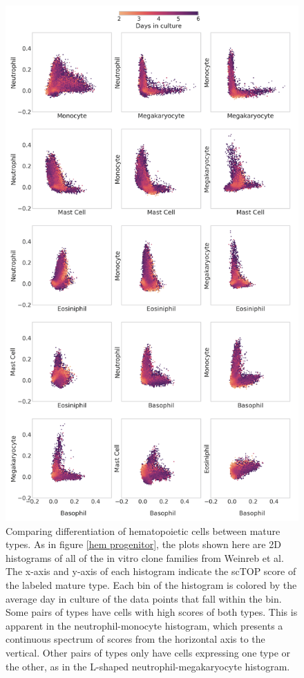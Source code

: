 \documentclass[aps,superscriptaddress, notitlepage,longbibliography]{revtex4-1}
\begin{document}
\begin{figure}
	\centering
		\includegraphics[scale=0.59]{figs/hem mature hists.png}
	\caption{Comparing differentiation of hematopoietic cells between mature types. As in figure \ref{hem progenitor}, the plots shown here are 2D histograms of all of the in vitro clone families from Weinreb et al. The x-axis and y-axis of each histogram indicate the scTOP score of the labeled mature type. Each bin of the histogram is colored by the average day in culture of the data points that fall within the bin.  Some pairs of types have cells with high scores of both types. This is apparent in the neutrophil-monocyte histogram, which presents a continuous spectrum of scores from the horizontal axis to the vertical. Other pairs of types only have cells expressing one type or the other, as in the L-shaped neutrophil-megakaryocyte histogram.}
	\label{hem mature}
\end{figure}
\end{document}

